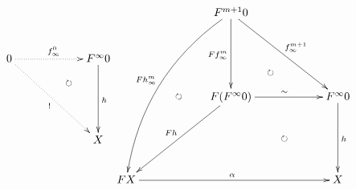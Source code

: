 \documentclass[12pt]{article}
\begin{document}
\pagestyle{empty}

\begin{align*}
  \vcenter{
    \xymatrix@=60pt{
      0
      \ar@{.>}[r]^{f^0_\infty}
      \ar@{.>}[rd]_{!}
      \ar@/^20pt/@{{}{ }{}}[rd]|{\circlearrowright}
      &
      F^\infty 0
      \ar@{->}[d]^{h}
      \\
      &
      X
    }
  }
  \vcenter{
    \xymatrix@=60pt{
      &
      F^{m + 1} 0
      \ar@{->}[rd]^{f^{m + 1}_\infty}
      \ar@{->}[d]_{F f^m_\infty}
      \ar@/_20pt/@{->}[ldd]_{F h^m_\infty}
      \ar@/_20pt/@{{}{ }{}}[rd]|{\circlearrowright}
      \ar@{{}{ }{}}[ldd]|{\circlearrowright}
      \\
      &
      F (F^\infty 0)
      \ar@{->}[r]^{\sim}
      \ar@{->}[ld]_{F h}
      \ar@{{}{ }{}}[rd]|{\circlearrowright}
      &
      F^\infty 0
      \ar@{->}[d]^{h}
      \\
      F X
      \ar@{->}[rr]^{\alpha}
      &
      &
      X
    }
  }
\end{align*}
\end{document}
